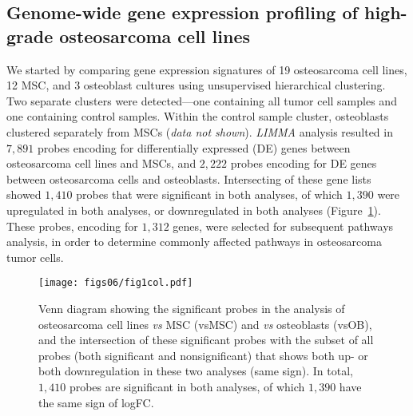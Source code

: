 \subsection{Genome\hyp{}wide gene expression profiling of high\hyp{}grade osteosarcoma cell lines}
We started by comparing gene expression signatures of 19 osteosarcoma cell lines, 12 MSC, and 3 osteoblast cultures using unsupervised hierarchical clustering. Two separate clusters were detected---one containing all tumor cell samples and one containing control samples. Within the control sample cluster, osteoblasts clustered separately from MSCs ({\it data not shown}). {\it  LIMMA} analysis resulted in $7,891$ probes encoding for differentially expressed (DE) genes between osteosarcoma cell lines and MSCs, and $2,222$ probes encoding for DE genes between osteosarcoma cells and osteoblasts. Intersecting of these gene lists showed $1,410$ probes that were significant in both analyses, of which $1,390$ were upregulated in both analyses, or downregulated in both analyses (Figure~\ref{fig6.1}). These probes, encoding for $1,312$ genes, were selected for subsequent pathways analysis, in order to determine commonly affected pathways in osteosarcoma tumor cells.
%
\begin{figure}[htbp]
  \centering
  \begin{minipage}[b]{0.50\linewidth}
   \texttt{[image: figs06/fig1col.pdf]}	%
  \end{minipage}
    \hfill
  \begin{minipage}[b]{0.46\linewidth}
     \caption{Venn diagram showing the significant probes in the analysis of osteosarcoma cell lines {\it vs} MSC (vsMSC) and {\it vs} osteoblasts (vsOB), and the intersection of these significant probes with the subset of all probes (both significant and nonsignificant) that shows both up- or both downregulation in these two analyses (same sign). In total, $1,410$ probes are significant in both analyses, of which $1,390$ have the same sign of logFC.}
     \label{fig6.1}
     \end{minipage}
\end{figure}
%

